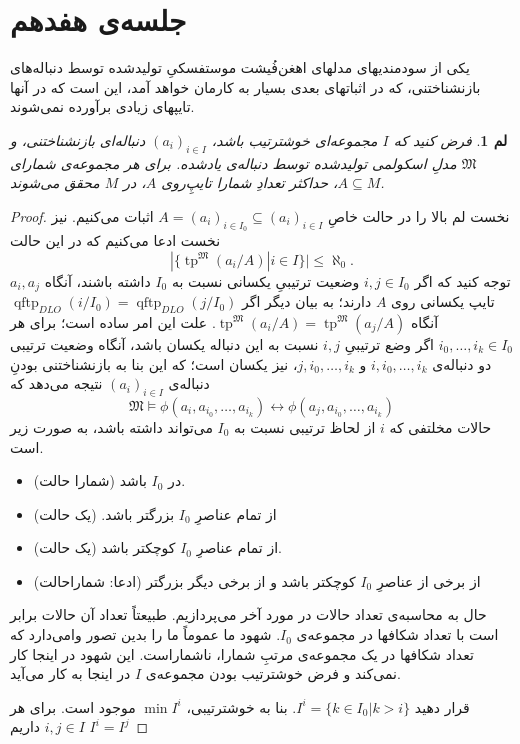 \documentclass[12pt,a4paper]{report}
\theoremstyle{colorhead}
\newtheorem{lem}[thm]{لم}
\DeclareMathOperator{\qftp}{qftp}
\DeclareMathOperator{\tp}{tp}
\begin{document}
\section{جلسه‌ی هفدهم}
یکی از 
سودمندیهای 
مدلهای اهغن‌فُیشت موستفسکیِ
تولیدشده توسط دنباله‌های بازنشناختنی، 
که در اثباتهای بعدی بسیار به کارمان خواهد آمد،
این است
که در آنها تایپهای زیادی برآورده نمی‌شوند.
\begin{lem}
فرض کنید که 
$I$
مجموعه‌ای خوشترتیب باشد،
$(a_i)_{i\in I}$
دنباله‌ای بازنشناختنی، و
$\mathfrak{M}$
مدلِ اسکولمی تولیدشده توسط دنباله‌ی یادشده. برای هر مجموعه‌ی شمارای
$A\subseteq M$،
حداکثر تعدادِ شمارا تایپِ‌روی
$A$،
در
$M$
محقق می‌شوند.
\end{lem}
\begin{proof}
نخست لم بالا را در حالت خاصِ
$A=(a_i)_{i\in I_0}\subseteq (a_i)_{i\in I}$
اثبات می‌کنیم. نیز نخست ادعا می‌کنیم که در این حالت
\[
|\{\tp^\mathfrak{M}(a_i/A)|i\in I\}|\leq \aleph_0.
\]
توجه کنید که  اگر
$i,j\in I_0$
 وضعیت ترتیبیِ یکسانی نسبت به
$I_0$
داشته باشند، 
آنگاه
$a_i,a_j$
تایپ یکسانی روی
$A$
دارند؛ به بیان دیگر
اگر
$\qftp_{DLO}(i/I_0)=\qftp_{DLO}(j/I_0)$
آنگاه
$\tp^\mathfrak{M}(a_i/A)=\tp^\mathfrak{M}(a_j/A)$.
علت این امر ساده است؛ برای هر
$i_0,\ldots,i_k\in I_0$
اگر وضع ترتیبیِ
$i,j$ 
نسبت به این دنباله یکسان باشد، آنگاه 
وضعیت ترتیبی دو دنباله‌ی
$i,i_0,\ldots,i_k$
و
$j,i_0,\ldots,i_k$،
نیز یکسان است؛ که این 
 بنا به بازنشناختنی بودنِ دنباله‌ی
$(a_i)_{i\in I}$
نتیجه می‌دهد که
\[
\mathfrak{
M}\models \phi(a_i,a_{i_0},\ldots,a_{i_k})
\leftrightarrow 
\phi(a_j,a_{i_0},\ldots,a_{i_k})
\]
حالات مخلتفی که 
$i$
از لحاظ ترتیبی نسبت به
$I_0$
می‌تواند داشته باشد، به صورت زیر است.
\begin{itemize}
\item 
در
$I_0$
باشد (شمارا حالت).
\item 
از تمام عناصرِ
$I_0$
بزرگتر باشد.
(یک حالت)
\item 
از تمام عناصرِ
$I_0$
کوچکتر باشد (یک حالت).
\item
از برخی از عناصرِ
$I_0$
کوچکتر باشد و از برخی دیگر بزرگتر (ادعا: شماراحالت)
\end{itemize}
حال به محاسبه‌ی تعداد حالات در مورد آخر می‌پردازیم. طبیعتاً تعداد آن حالات برابر است با تعداد شکافها در مجموعه‌ی
$I_0$.
شهود ما عموماً ما را بدین تصور وامی‌دارد که تعداد شکافها در یک  مجموعه‌ی مرتبِ‌ شمارا، ناشماراست. این شهود در اینجا کار نمی‌کند و
فرض خوشترتیب بودن مجموعه‌ی
$I$
در اینجا به کار می‌آید.
\par 
قرار دهید
$I^i=\{k\in I_0|k>i\}$.
بنا به خوشترتیبی،
$\min I^i$
موجود است. برای هر
$i,j\in I$
داریم
$I^i=I^j$

\end{proof}
\end{document}
